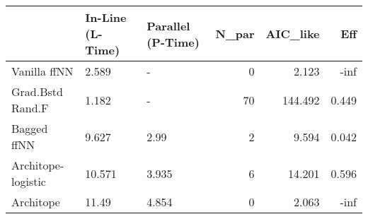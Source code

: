 \begin{tabular}{lllrrr}
\toprule
{} & In-Line (L-Time) & Parallel (P-Time) &  N\_par &  AIC\_like &    Eff \\
\midrule
Vanilla ffNN       &            2.589 &                 - &      0 &     2.123 &   -inf \\
Grad.Bstd Rand.F   &            1.182 &                 - &     70 &   144.492 &  0.449 \\
Bagged ffNN        &            9.627 &              2.99 &      2 &     9.594 &  0.042 \\
Architope-logistic &           10.571 &             3.935 &      6 &    14.201 &  0.596 \\
Architope          &            11.49 &             4.854 &      0 &     2.063 &   -inf \\
\bottomrule
\end{tabular}
